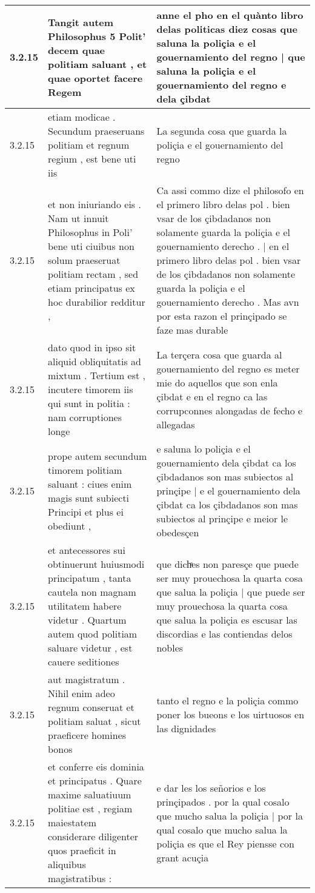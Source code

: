 \begin{tabular}{|p{1cm}|p{6.5cm}|p{6.5cm}|}
3.2.15 & Tangit autem Philosophus 5 Polit’ decem quae politiam saluant , et quae oportet facere Regem & anne el pho en el quànto libro delas politicas diez cosas que saluna la poliçia e el gouernamiento del regno | que saluna la poliçia e el gouernamiento del regno e dela çibdat \\\hline
3.2.15 & etiam modicae . Secundum praeseruans politiam et regnum regium , est bene uti iis & La segunda cosa que guarda la poliçia e el gouernamiento del regno \\\hline
3.2.15 & et non iniuriando eis . Nam ut innuit Philosophus in Poli’ bene uti ciuibus non solum praeseruat politiam rectam , sed etiam principatus ex hoc durabilior redditur , & Ca assi commo dize el philosofo en el primero libro delas pol . bien vsar de los çibdadanos non solamente guarda la poliçia e el gouernamiento derecho . | en el primero libro delas pol . bien vsar de los çibdadanos non solamente guarda la poliçia e el gouernamiento derecho . Mas avn por esta razon el prinçipado se faze mas durable \\\hline
3.2.15 & dato quod in ipso sit aliquid obliquitatis ad mixtum . Tertium est , incutere timorem iis qui sunt in politia : nam corruptiones longe & La terçera cosa que guarda al gouernamiento del regno es meter mie do aquellos que son enla çibdat e en el regno ca las corrupconnes alongadas de fecho e allegadas \\\hline
3.2.15 & prope autem secundum timorem politiam saluant : ciues enim magis sunt subiecti Principi et plus ei obediunt , & e saluna lo poliçia e el gouernamiento dela çibdat ca los çibdadanos son mas subiectos al prinçipe | e el gouernamiento dela çibdat ca los çibdadanos son mas subiectos al prinçipe e meior le obedesçen \\\hline
3.2.15 & et antecessores sui obtinuerunt huiusmodi principatum , tanta cautela non magnam utilitatem habere videtur . Quartum autem quod politiam saluare videtur , est cauere seditiones & que dichͣes non paresçe que puede ser muy prouechosa la quarta cosa que salua la poliçia | que puede ser muy prouechosa la quarta cosa que salua la poliçia es escusar las discordias e las contiendas delos nobles \\\hline
3.2.15 & aut magistratum . Nihil enim adeo regnum conseruat et politiam saluat , sicut praeficere homines bonos & tanto el regno e la poliçia commo poner los bueons e los uirtuosos en las dignidades \\\hline
3.2.15 & et conferre eis dominia et principatus . Quare maxime saluatiuum politiae est , regiam maiestatem considerare diligenter quos praeficit in aliquibus magistratibus : & e dar les los señorios e los prinçipados . por la qual cosalo que mucho salua la poliçia | por la qual cosalo que mucho salua la poliçia es que el Rey piensse con grant acuçia \\\hline

\end{tabular}

